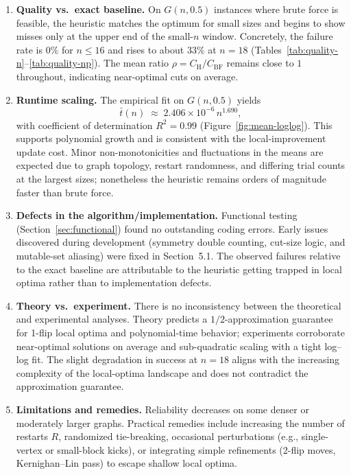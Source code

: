 \documentclass[12pt]{article}
\begin{document}
\begin{enumerate}
  \item \textbf{Quality vs.\ exact baseline.} On $G(n,0.5)$ instances where brute force is feasible, the heuristic matches the optimum for small sizes and begins to show misses only at the upper end of the small-$n$ window. Concretely, the failure rate is $0\%$ for $n\le 16$ and rises to about $33\%$ at $n=18$ (Tables~\ref{tab:quality-n}--\ref{tab:quality-np}). The mean ratio $\rho=C_{\mathrm H}/C_{\mathrm{BF}}$ remains close to $1$ throughout, indicating near-optimal cuts on average.
  
  \item \textbf{Runtime scaling.} The empirical fit on $G(n,0.5)$ yields
  \[
  \bar t(n) \;\approx\; 2.406\times 10^{-6}\, n^{1.690},
  \]
  with coefficient of determination $R^2=0.99$ (Figure~\ref{fig:mean-loglog}). This supports polynomial growth and is consistent with the local-improvement update cost. Minor non-monotonicities and fluctuations in the means are expected due to graph topology, restart randomness, and differing trial counts at the largest sizes; nonetheless the heuristic remains orders of magnitude faster than brute force.
  
  \item \textbf{Defects in the algorithm/implementation.} Functional testing (Section~\ref{sec:functional}) found no outstanding coding errors. Early issues discovered during development (symmetry double counting, cut-size logic, and mutable-set aliasing) were fixed in Section~5.1. The observed failures relative to the exact baseline are attributable to the heuristic getting trapped in local optima rather than to implementation defects.
  
  \item \textbf{Theory vs.\ experiment.} There is no inconsistency between the theoretical and experimental analyses. Theory predicts a $1/2$-approximation guarantee for 1-flip local optima and polynomial-time behavior; experiments corroborate near-optimal solutions on average and sub-quadratic scaling with a tight log--log fit. The slight degradation in success at $n=18$ aligns with the increasing complexity of the local-optima landscape and does not contradict the approximation guarantee.
  
  \item \textbf{Limitations and remedies.} Reliability decreases on some denser or moderately larger graphs. Practical remedies include increasing the number of restarts $R$, randomized tie-breaking, occasional perturbations (e.g., single-vertex or small-block kicks), or integrating simple refinements (2-flip moves, Kernighan--Lin pass) to escape shallow local optima.
\end{enumerate}
\end{document}
